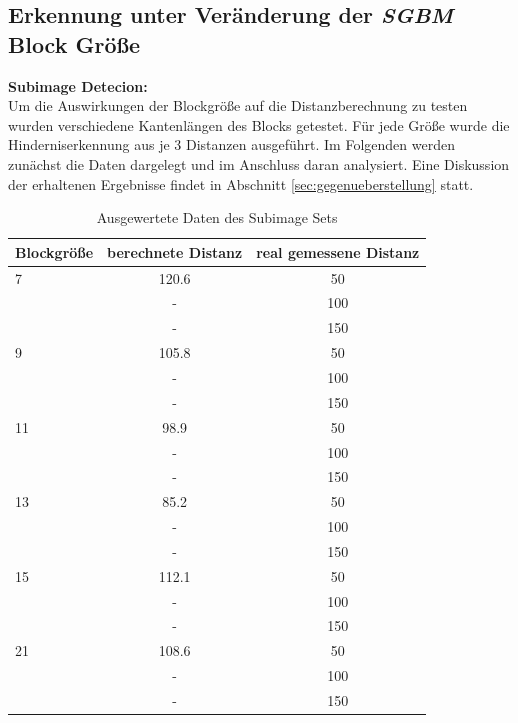 \noindent
\subsection{Erkennung unter Veränderung der \emph{SGBM} Block Größe}
\label{subsec:block_size_change}

\textbf{Subimage Detecion:}\\
\noindent
Um die Auswirkungen der Blockgröße auf die Distanzberechnung zu testen wurden verschiedene Kantenlängen des Blocks getestet. Für jede Größe wurde die Hinderniserkennung aus je 3 Distanzen ausgeführt. Im Folgenden werden zunächst die Daten dargelegt und im Anschluss daran analysiert. Eine Diskussion der erhaltenen Ergebnisse findet in Abschnitt \ref{sec:gegenueberstellung} statt.\\
	
\begin{table}[h]
\centering
\begin{tabular}{|l||c|c|}
\hline
Blockgröße & berechnete Distanz & real gemessene Distanz \\
\hline\hline
7          & 120.6          		& 50                     \\
           &  -                 & 100                    \\
           &  -                 & 150                    \\
\hline
9          & 105.8          		& 50                     \\
           &  -                 & 100                    \\
           &  -                 & 150                    \\
\hline
11         & 98.9           		& 50                     \\
           &  -                 & 100                    \\
           &  -                 & 150                    \\
\hline
13         & 85.2          		& 50                     \\
           &  -                 & 100                    \\
           &  -                 & 150                    \\
\hline
15         & 112.1		        & 50                     \\
           &  -                 & 100                    \\
           &  -                 & 150                    \\
\hline
21         & 108.6         		& 50                     \\
           &  -                 & 100                    \\
           &  -                 & 150                    \\
\hline
\end{tabular}
\caption{Ausgewertete Daten des Subimage Sets}
\label{tbl:distance_subimage}
\end{table}	

